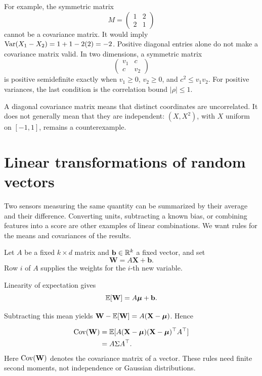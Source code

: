For example, the symmetric matrix
\[
  M=\begin{pmatrix}1&2\\2&1\end{pmatrix}
\]
cannot be a covariance matrix. It would imply
\(\operatorname{Var}(X_1-X_2)=1+1-2(2)=-2\). Positive diagonal entries alone do not
make a covariance matrix valid. In two dimensions, a symmetric matrix
\[
  \begin{pmatrix}v_1&c\\c&v_2\end{pmatrix}
\]
is positive semidefinite exactly when
\(v_1\ge0\), \(v_2\ge0\), and \(c^2\le v_1v_2\).
For positive variances, the last condition is the correlation bound
\(|\rho|\le1\).

A diagonal covariance matrix means that distinct coordinates are
uncorrelated. It does not generally mean that they are independent:
\((X,X^2)\), with \(X\) uniform on \([-1,1]\), remains a counterexample.

\section{Linear transformations of random vectors}
\label{sec:random-linear-transforms}

Two sensors measuring the same quantity can be summarized by their
average and their difference. Converting units, subtracting a known
bias, or combining features into a score are other examples of linear
combinations. We want rules for the means and covariances of the results.

Let \(A\) be a fixed \(k\times d\) matrix and \(\mathbf b\in\mathbb{R}^k\)
a fixed vector, and set
\[
  \mathbf W=A\mathbf X+\mathbf b.
\]
Row \(i\) of \(A\) supplies the weights for the \(i\)-th new variable.
\begin{result}
Linearity of expectation gives
\begin{equation}
  \mathbb{E}[\mathbf W]=A\boldsymbol\mu+\mathbf b.
  \label{eq:linear-mean-vector}
\end{equation}
\end{result}
Subtracting this mean yields
\(\mathbf W-\mathbb{E}[\mathbf W]=A(\mathbf X-\boldsymbol\mu)\). Hence
\begin{result}
\begin{align}
  \operatorname{Cov}(\mathbf W)
    &=\mathbb{E}[A(\mathbf X-\boldsymbol\mu)
                  (\mathbf X-\boldsymbol\mu)^\top A^\top]\notag\\
    &=A\Sigma A^\top.
  \label{eq:linear-covariance-vector}
\end{align}
Here \(\operatorname{Cov}(\mathbf W)\) denotes the covariance matrix of a vector.
These rules need finite second moments, not independence or Gaussian
distributions.
\end{result}

